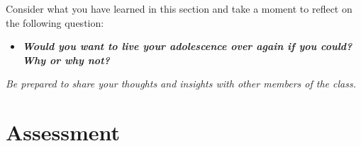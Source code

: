 \documentclass[
]{book}
\providecommand{\tightlist}{%
  \setlength{\itemsep}{0pt}\setlength{\parskip}{0pt}}
\begin{document}
\begin{reflect}
Consider what you have learned in this section and take a moment to reflect on the following question:

\begin{itemize}
\tightlist
\item
  \textbf{\emph{Would you want to live your adolescence over again if you could? Why or why not?}}
\end{itemize}

\emph{Be prepared to share your thoughts and insights with other members of the class.}
\end{reflect}

\hypertarget{assessment-2}{%
\section*{Assessment}\label{assessment-2}}
\end{document}

